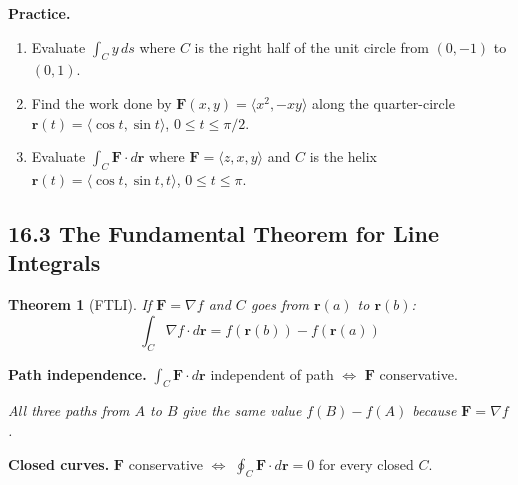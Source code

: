\documentclass[12pt]{article}
\theoremstyle{compact}
\newtheorem{thm}{Theorem}[section]
\renewcommand{\vec}[1]{\mathbf{#1}}
\newcommand{\grad}{\nabla}
\begin{document}
\medskip\textbf{Practice.}
\begin{enumerate}[noitemsep]
  \item Evaluate $\int_C y\,ds$ where $C$ is the right half of the unit circle from $(0,-1)$ to $(0,1)$.
  \item Find the work done by $\vec{F}(x,y)=\langle x^2,-xy\rangle$ along the quarter-circle $\vec{r}(t)=\langle\cos t,\sin t\rangle$, $0\le t\le\pi/2$.
  \item Evaluate $\int_C\vec{F}\cdot d\vec{r}$ where $\vec{F}=\langle z,x,y\rangle$ and $C$ is the helix $\vec{r}(t)=\langle\cos t,\sin t,t\rangle$, $0\le t\le\pi$.
\end{enumerate}

\subsection{16.3 The Fundamental Theorem for Line Integrals}

\begin{thm}[FTLI]
If $\vec{F}=\grad f$ and $C$ goes from $\vec{r}(a)$ to $\vec{r}(b)$:
\[
\int_C \grad f\cdot d\vec{r} = f(\vec{r}(b))-f(\vec{r}(a))
\]
\end{thm}

\textbf{Path independence.} $\int_C\vec{F}\cdot d\vec{r}$ independent of path $\iff$ $\vec{F}$ conservative.

\begin{center}
\end{center}

\textit{All three paths from $A$ to $B$ give the same value $f(B)-f(A)$ because $\vec F=\grad f$.}

\textbf{Closed curves.} $\vec{F}$ conservative $\iff$ $\oint_C\vec{F}\cdot d\vec{r}=0$ for every closed $C$.
\end{document}

